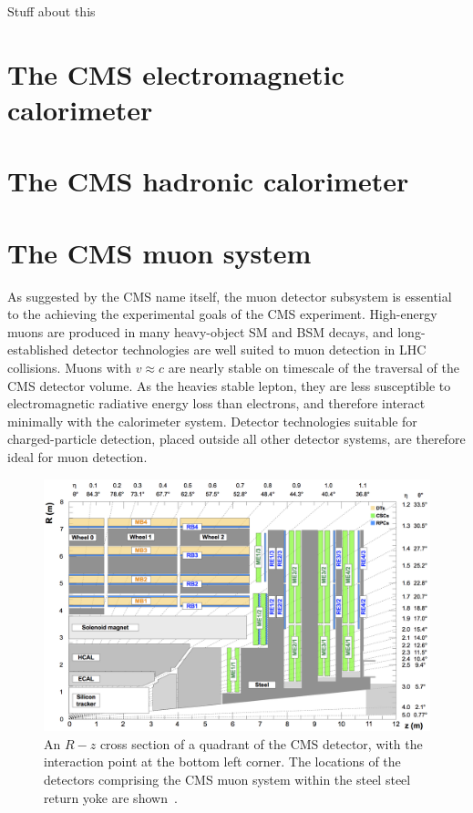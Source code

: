 Stuff about this

\section{The CMS electromagnetic calorimeter}
\section{The CMS hadronic calorimeter}
\section{The CMS muon system}

As suggested by the CMS name itself, the muon detector subsystem is essential to the
achieving the experimental goals of the CMS experiment. 
High-energy muons are produced in many heavy-object SM and BSM 
decays, and long-established detector technologies are well suited to muon detection in LHC collisions.
Muons with $v\approx c$ are nearly stable
on timescale of the traversal of the CMS detector volume. As the heavies stable lepton, 
they are less susceptible to electromagnetic radiative energy loss than electrons, and therefore
interact minimally with the calorimeter system. Detector technologies suitable for
charged-particle detection, placed outside all other detector systems, 
are therefore ideal for muon detection. 

\begin{figure}[htbp]
  \centering
   \includegraphics[width=\textwidth]{figures/LHCandCMS/MuonSystemGeometry.png}
  \caption{
    An $R-z$ cross section of a quadrant of the CMS detector, with the interaction
    point at the bottom left corner. The locations of the detectors
    comprising the CMS muon system within the steel steel return yoke
    are shown~\cite{Chatrchyan:2012xdj}.
        }
 \label{fig:muonSystemGeo}
\end{figure}

